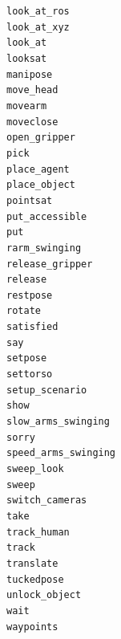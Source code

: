 \documentclass[compress]{beamer}
\begin{document}
{{{\begin{frame}{}
\begin{multicols}{4}
{\tt look\_at\_ros} \\
{\tt look\_at\_xyz} \\
{\tt look\_at} \\
{\tt looksat} \\
{\tt manipose} \\
{\tt move\_head} \\
{\tt movearm} \\
{\tt moveclose} \\
{\tt open\_gripper} \\
{\tt pick} \\
{\tt place\_agent} \\
{\tt place\_object} \\
{\tt pointsat} \\
{\tt put\_accessible} \\
{\tt put} \\
{\tt rarm\_swinging} \\
{\tt release\_gripper} \\
{\tt release} \\
{\tt restpose} \\
{\tt rotate} \\
{\tt satisfied} \\
{\tt say} \\
{\tt setpose} \\
{\tt settorso} \\
{\tt setup\_scenario} \\
{\tt show} \\
{\tt slow\_arms\_swinging} \\
{\tt sorry} \\
{\tt speed\_arms\_swinging} \\
{\tt sweep\_look} \\
{\tt sweep} \\
{\tt switch\_cameras} \\
{\tt take} \\
{\tt track\_human} \\
{\tt track} \\
{\tt translate} \\
{\tt tuckedpose} \\
{\tt unlock\_object} \\
{\tt wait} \\
{\tt waypoints} \\
    \end{multicols}
\end{frame}
}


}}
\end{document}
